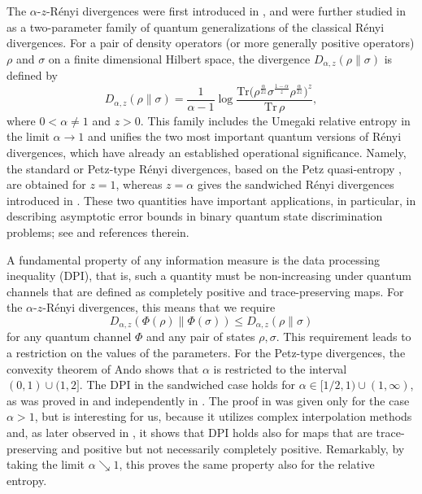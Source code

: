 \documentclass[12pt]{article}
\theoremstyle{definition}
\theoremstyle{remark}
\numberwithin{equation}{section}
\begin{document}
The $\alpha$-$z$-R\'enyi divergences were {first introduced in \cite{jaksic2012entropic}, and
were further studied} in \cite{audenaert2015alpha} as a two-parameter family of quantum generalizations
of the classical R\'enyi divergences. For a pair of density operators (or more generally positive
operators) $\rho$ and $\sigma$ on a finite dimensional Hilbert space, the divergence
$D_{\alpha,z}(\rho\|\sigma)$ is defined by 
\[
D_{\alpha,z}(\rho\|\sigma)=\frac{1}{\alpha-1}\log
{\frac{\mathrm{Tr}\bigl(\rho^{\frac{\alpha}{2z}}\sigma^{\frac{1-\alpha}{z}}
\rho^{\frac{\alpha}{2z}}\bigr)^z}{\mathrm{Tr}\,\rho},}
\]
where $0<\alpha\ne 1$ and $z>0$. This family includes the {Umegaki} relative entropy in the
limit $\alpha\to 1$ and unifies the two most important quantum
versions of R\'enyi divergences, which have already an established operational
significance. Namely, the standard or Petz-type R\'enyi divergences,  based on the Petz
quasi-entropy \cite{petz1985quasi,petz1986quasi}, are obtained for $z=1$,  whereas $z=\alpha$ gives
the sandwiched R\'enyi divergences introduced in \cite{mullerlennert2013onquantum, wilde2014strong}.
These two quantities have important applications, in particular, in describing asymptotic error bounds in
binary quantum state discrimination problems; see \cite{audenaert2007discriminating,jaksic2012quantum,
mosonyi2015quantum,mosonyi2015twoapproaches,nussbaum2009thechernoff} and references therein.


A fundamental property of any information measure is the data processing inequality (DPI), that
is, such a quantity must be non-increasing under quantum channels that are defined as completely
positive and trace-preserving maps. For the {$\alpha$-$z$-R\'enyi} divergences, this means
that we require
\[
D_{\alpha,z}(\Phi(\rho)\|\Phi(\sigma))\le D_{\alpha,z}(\rho\|\sigma)
\]
for any quantum channel $\Phi$ and any pair of states $\rho,\sigma$. This requirement
leads to a restriction on the values of the parameters. For the Petz-type divergences,
 the convexity theorem of Ando \cite{ando1979concavity} shows that  $\alpha$ is restricted to the interval
$(0,1)\cup (1,2]$. The DPI in the sandwiched case holds for $\alpha\in
[1/2,1)\cup(1,\infty)$, as was proved in  \cite{frank2013monotonicity}  and independently in
\cite{beigi2013sandwiched}. The proof in \cite{beigi2013sandwiched} was given only for
the case $\alpha>1$, but is interesting for us, because it utilizes complex interpolation
methods and, as later observed in \cite{mullerhermes2017monotonicity}, it shows that DPI holds also for
maps that are trace-preserving and positive but not necessarily completely positive. Remarkably, by taking
the limit $\alpha\searrow 1$, this proves the same property also for the relative entropy.
\end{document}
